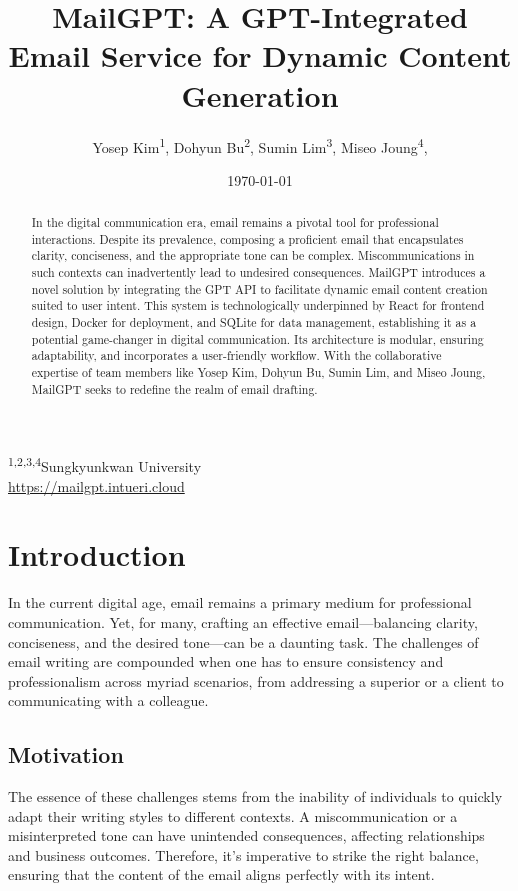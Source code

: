 \documentclass[12pt]{article}
\title{MailGPT: A GPT-Integrated Email Service for Dynamic Content Generation}
\author{
    Yosep Kim\textsuperscript{1}, 
    Dohyun Bu\textsuperscript{2}, 
    Sumin Lim\textsuperscript{3}, 
    Miseo Joung\textsuperscript{4}, 
}
\date{\today}
\begin{document}
\maketitle

\begin{center}
	\textsuperscript{1,2,3,4}Sungkyunkwan University\\
	\href{https://mailgpt.intueri.cloud}{https://mailgpt.intueri.cloud}
\end{center}
\begin{abstract}
	In the digital communication era, email remains a pivotal tool for professional interactions. Despite its prevalence, composing a proficient email that encapsulates clarity, conciseness, and the appropriate tone can be complex. Miscommunications in such contexts can inadvertently lead to undesired consequences. MailGPT introduces a novel solution by integrating the GPT API to facilitate dynamic email content creation suited to user intent. This system is technologically underpinned by React for frontend design, Docker for deployment, and SQLite for data management, establishing it as a potential game-changer in digital communication. Its architecture is modular, ensuring adaptability, and incorporates a user-friendly workflow. With the collaborative expertise of team members like Yosep Kim, Dohyun Bu, Sumin Lim, and Miseo Joung, MailGPT seeks to redefine the realm of email drafting.
\end{abstract}
\section{Introduction}

In the current digital age, email remains a primary medium for professional communication. Yet, for many, crafting an effective email—balancing clarity, conciseness, and the desired tone—can be a daunting task. The challenges of email writing are compounded when one has to ensure consistency and professionalism across myriad scenarios, from addressing a superior or a client to communicating with a colleague. 

\subsection{Motivation}

The essence of these challenges stems from the inability of individuals to quickly adapt their writing styles to different contexts. A miscommunication or a misinterpreted tone can have unintended consequences, affecting relationships and business outcomes. Therefore, it's imperative to strike the right balance, ensuring that the content of the email aligns perfectly with its intent.
\end{document}
